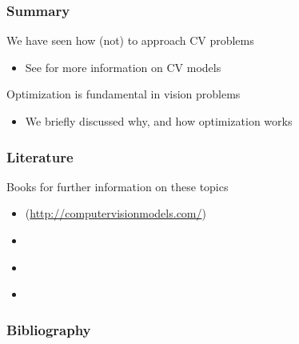 \documentclass[xetex,professionalfont]{beamer}
\begin{document}

\begin{frame}
\frametitle{Summary}

We have seen how (not) to approach CV problems
\begin{itemize}
    \item See \cite{prince12} for more information on CV models
\end{itemize}

\bigskip
Optimization is fundamental in vision problems
\begin{itemize}
    \item We briefly discussed why, and how optimization works
\end{itemize}

\end{frame}


\begin{frame}
\frametitle{Literature}

Books for further information on these topics
\begin{itemize}
    \item \cite{prince12} (\url{http://computervisionmodels.com/})
    \item \cite{bishop2006}
    \item \cite{boyd2009}
    \item \cite{wright1999}
\end{itemize}

\end{frame}


\begin{frame}
\frametitle{Bibliography}

\printbibliography

\end{frame}
\end{document}
